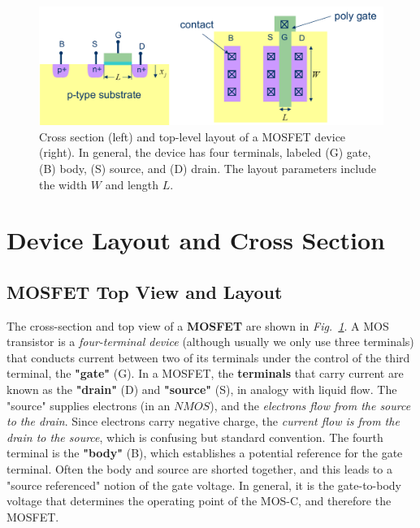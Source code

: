 \begin{figure}[t]
\centering
\includegraphics[width=.95\columnwidth]{mosfet_layout}
\caption{Cross section (left) and top-level layout of a MOSFET device (right).  In general, the device has four terminals, labeled (G) gate, (B) body, (S) source, and (D) drain.  The layout parameters include the width $W$ and length $L$.}
\label{fig:mosfet_layout}
\end{figure}
\section{Device Layout and Cross Section}
\subsection{MOSFET Top View and Layout}
The cross-section and top view of a \textbf{MOSFET} are shown in \emph{Fig.~\ref{fig:mosfet_layout}}.  A MOS transistor is a \textit{four-terminal device} (although usually we only use three terminals) that conducts current between two of its terminals under the control of the third terminal, the \textbf{"gate"} (G).  In a MOSFET, the \textbf{terminals} that carry current are known as the \textbf{"drain"} (D) and \textbf{"source"} (S), in analogy with liquid flow.  The "source" supplies electrons (in an $NMOS$), and the \textit{electrons flow from the source to the drain}.  Since electrons carry negative charge, the \textit{current flow is from the drain to the source}, which is confusing but standard convention.  The fourth terminal is the \textbf{"body"} (B), which establishes a potential reference for the gate terminal.  Often the body and source are shorted together, and this leads to a "source referenced" notion of the gate voltage.  In general, it is the gate-to-body voltage that determines the operating point of the MOS-C, and therefore the MOSFET.

